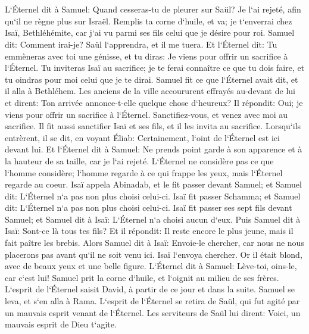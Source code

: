 \chapter{}

\verse L`Éternel dit à Samuel: Quand cesseras-tu de pleurer sur Saül? Je l`ai rejeté, afin qu`il ne règne plus sur Israël. Remplis ta corne d`huile, et va; je t`enverrai chez Isaï, Bethléhémite, car j`ai vu parmi ses fils celui que je désire pour roi. 
\verse Samuel dit: Comment irai-je? Saül l`apprendra, et il me tuera. Et l`Éternel dit: Tu emmèneras avec toi une génisse, et tu diras: Je viens pour offrir un sacrifice à l`Éternel. 
\verse Tu inviteras Isaï au sacrifice; je te ferai connaître ce que tu dois faire, et tu oindras pour moi celui que je te dirai. 
\verse Samuel fit ce que l`Éternel avait dit, et il alla à Bethléhem. Les anciens de la ville accoururent effrayés au-devant de lui et dirent: Ton arrivée annonce-t-elle quelque chose d`heureux? 
\verse Il répondit: Oui; je viens pour offrir un sacrifice à l`Éternel. Sanctifiez-vous, et venez avec moi au sacrifice. Il fit aussi sanctifier Isaï et ses fils, et il les invita au sacrifice. 
\verse Lorsqu`ils entrèrent, il se dit, en voyant Éliab: Certainement, l`oint de l`Éternel est ici devant lui. 
\verse Et l`Éternel dit à Samuel: Ne prends point garde à son apparence et à la hauteur de sa taille, car je l`ai rejeté. L`Éternel ne considère pas ce que l`homme considère; l`homme regarde à ce qui frappe les yeux, mais l`Éternel regarde au coeur. 
\verse Isaï appela Abinadab, et le fit passer devant Samuel; et Samuel dit: L`Éternel n`a pas non plus choisi celui-ci. 
\verse Isaï fit passer Schamma; et Samuel dit: L`Éternel n`a pas non plus choisi celui-ci. 
\verse Isaï fit passer ses sept fils devant Samuel; et Samuel dit à Isaï: L`Éternel n`a choisi aucun d`eux. 
\verse Puis Samuel dit à Isaï: Sont-ce là tous tes fils? Et il répondit: Il reste encore le plus jeune, mais il fait paître les brebis. Alors Samuel dit à Isaï: Envoie-le chercher, car nous ne nous placerons pas avant qu`il ne soit venu ici. 
\verse Isaï l`envoya chercher. Or il était blond, avec de beaux yeux et une belle figure. L`Éternel dit à Samuel: Lève-toi, oins-le, car c`est lui! 
\verse Samuel prit la corne d`huile, et l`oignit au milieu de ses frères. L`esprit de l`Éternel saisit David, à partir de ce jour et dans la suite. Samuel se leva, et s`en alla à Rama. 
\verse L`esprit de l`Éternel se retira de Saül, qui fut agité par un mauvais esprit venant de l`Éternel. 
\verse Les serviteurs de Saül lui dirent: Voici, un mauvais esprit de Dieu t`agite. 
